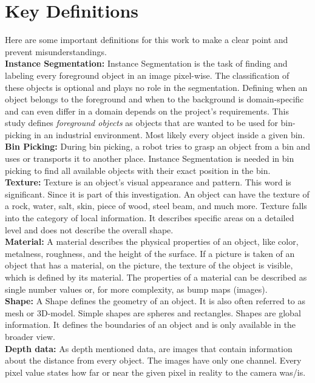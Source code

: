 	\section{Key Definitions}
	\label{sec:key-definitions}
		Here are some important definitions for this work to make a clear point and prevent misunderstandings.\\
		\textbf{Instance Segmentation:} Instance Segmentation is the task of finding and labeling every foreground object in an image pixel-wise. The classification of these objects is optional and plays no role in the segmentation. Defining when an object belongs to the foreground and when to the background is domain-specific and can even differ in a domain depends on the project's requirements. This study defines \textit{foreground objects} as objects that are wanted to be used for bin-picking in an industrial environment. Most likely every object inside a given bin.\\
		\textbf{Bin Picking:} During bin picking, a robot tries to grasp an object from a bin and uses or transports it to another place. Instance Segmentation is needed in bin picking to find all available objects with their exact position in the bin.\\
		\textbf{Texture:} Texture is an object's visual appearance and pattern. This word is significant. Since it is part of this investigation. An object can have the texture of a rock, water, salt, skin, piece of wood, steel beam, and much more. Texture falls into the category of local information. It describes specific areas on a detailed level and does not describe the overall shape.\\
		\textbf{Material:} A material describes the physical properties of an object, like color, metalness, roughness, and the height of the surface. If a picture is taken of an object that has a material, on the picture, the texture of the object is visible, which is defined by its material. The properties of a material can be described as single number values or, for more complexity, as bump maps (images).\\
		\textbf{Shape:} A Shape defines the geometry of an object. It is also often referred to as mesh or 3D-model. Simple shapes are spheres and rectangles. Shapes are global information. It defines the boundaries of an object and is only available in the broader view.\\
		\textbf{Depth data:} As depth mentioned data, are images that contain information about the distance from every object. The images have only one channel. Every pixel value states how far or near the given pixel in reality to the camera was/is.\\
